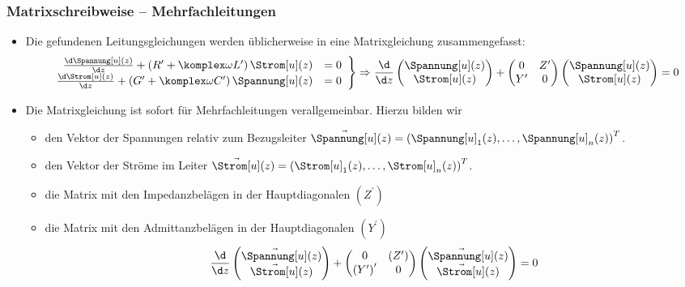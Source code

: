   \begin{frame}
    \frametitle{Matrixschreibweise -- Mehrfachleitungen}
      \begin{itemize}[<+->]
      \item Die gefundenen Leitungsgleichungen werden üblicherweise in eine \alert{Matrixgleichung} zusammengefasst:
        \begin{equation*}
          \left.
    \begin{array}{rl}
      \frac{\d \Spannung[u](z)}{\d z} + \left(R^\prime + \komplex\omega L^\prime\right) \Strom[u](z) &= 0 \\
      \frac{\d \Strom[u](z)}{\d z} +\left(G^\prime + \komplex\omega C^\prime\right) \Spannung[u](z)  &= 0 
    \end{array}\right\} \Rightarrow
  \frac{\d}{\d z}\begin{pmatrix}\Spannung[u](z)\\\Strom[u](z) \end{pmatrix}
  +
  \begin{pmatrix}
    0 & Z^\prime \\
    Y^\prime & 0
  \end{pmatrix}
  \begin{pmatrix}\Spannung[u](z)\\\Strom[u](z) \end{pmatrix} = 0
\end{equation*}
\item Die Matrixgleichung ist sofort für \alert{Mehrfachleitungen} verallgemeinbar. Hierzu bilden wir
  \begin{itemize}[<+->]
    \item den Vektor der Spannungen relativ zum Bezugsleiter \(\vec{\Spannung[u]}(z) = \left(\Spannung[u]_1(z),\ldots , \Spannung[u]_n(z) \right)^T\). 
    \item den Vektor der Ströme im Leiter  \(\vec{\Strom[u]}(z) = \left(\Strom[u]_1(z),\ldots , \Strom[u]_n(z) \right)^T\).
    \item die Matrix mit den Impedanzbelägen in der Hauptdiagonalen \(\left(Z^\prime\right)\) 
    \item die Matrix mit den Admittanzbelägen in der Hauptdiagonalen \(\left(Y^\prime\right)\) 
\begin{equation*}
  \frac{\d}{\d z}\begin{pmatrix}\vec{\Spannung[u]}(z)\\\vec{\Strom[u]}(z) \end{pmatrix}
  +
  \begin{pmatrix}
    0 & \left(Z^\prime\right) \\
    \left(Y^\prime\right)^\prime & 0
  \end{pmatrix}
  \begin{pmatrix}\vec{\Spannung[u]}(z)\\\vec{\Strom[u]}(z) \end{pmatrix} = 0
\end{equation*}

    \end{itemize}
  \end{itemize} 
  \end{frame}

